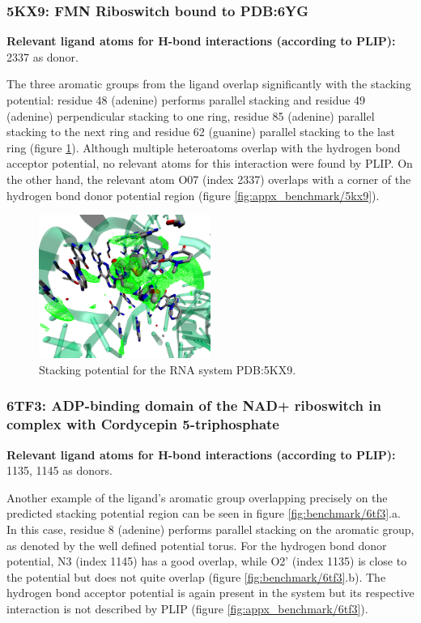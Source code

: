     \subsubsection{5KX9: FMN Riboswitch bound to PDB:6YG}
      \textbf{Relevant ligand atoms for H-bond interactions (according to PLIP):} 2337 as donor.

      The three aromatic groups from the ligand overlap significantly with the stacking potential: residue 48 (adenine) performs parallel stacking and residue 49 (adenine) perpendicular stacking to one ring, residue 85 (adenine) parallel stacking to the next ring and residue 62 (guanine) parallel stacking to the last ring (figure \ref{fig:benchmark/5kx9}). Although multiple heteroatoms overlap with the hydrogen bond acceptor potential, no relevant atoms for this interaction were found by PLIP. On the other hand, the relevant atom O07 (index 2337) overlaps with a corner of the hydrogen bond donor potential region (figure \ref{fig:appx_benchmark/5kx9}).

      \begin{figure}[H]
        \centering
        \includegraphics[width=0.5\textwidth]{figures/results/benchmark_rna/5kx9.png}
        \caption{\label{fig:benchmark/5kx9} Stacking potential for the RNA system PDB:5KX9.}
      \end{figure}
    \pagebreak

    \subsubsection{6TF3: ADP-binding domain of the NAD+ riboswitch in complex with Cordycepin 5-triphosphate}
      \textbf{Relevant ligand atoms for H-bond interactions (according to PLIP):} 1135, 1145 as donors.

      Another example of the ligand's aromatic group overlapping precisely on the predicted stacking potential region can be seen in figure \ref{fig:benchmark/6tf3}.a. In this case, residue 8 (adenine) performs parallel stacking on the aromatic group, as denoted by the well defined potential torus. For the hydrogen bond donor potential, N3 (index 1145) has a good overlap, while O2' (index 1135) is close to the potential but does not quite overlap (figure \ref{fig:benchmark/6tf3}.b). The hydrogen bond acceptor potential is again present in the system but its respective interaction is not described by PLIP (figure \ref{fig:appx_benchmark/6tf3}).

